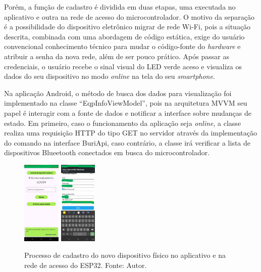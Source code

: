 Porém, a função de cadastro é dividida em duas etapas, uma executada no aplicativo e outra na rede de acesso do microcontrolador. O motivo da separação 
é a possibilidade do dispositivo eletrônico migrar de rede Wi-Fi, pois a situação descrita, combinada com uma abordagem de código estática, exige do usuário convencional conhecimento técnico para mudar o código-fonte do \textit{hardware} e 
atribuir a senha da nova rede, além de ser pouco prático. Após passar as credenciais, o usuário recebe o sinal visual do LED verde aceso e visualiza os dados do seu dispositivo no modo \textit{online} na tela do seu \textit{smartphone}.

Na aplicação Android, o método de busca dos dados para visualização foi implementado na classe ``EqpInfoViewModel'', pois na arquitetura MVVM seu papel é interagir com a fonte de dados e notificar a interface sobre mudanças de estado. Em primeiro, caso 
o funcionamento da aplicação seja \textit{online}, a classe realiza uma requisição HTTP do tipo GET no servidor através da implementação do comando na interface BuriApi, caso contrário, a classe irá verificar a lista de dispositivos Blueetooth conectados em busca do 
microcontrolador.

\begin{figure}[ht]
    \centering
    \includegraphics[width=0.16\textwidth]{img/buri-config-software.jpg}
    \includegraphics[width=0.16\textwidth]{img/buri-config-hardware.jpg}
    \caption{Processo de cadastro do novo dispositivo físico no aplicativo e na rede de acesso do ESP32. Fonte: Autor.}\label{figBuriConfig}
\end{figure}

